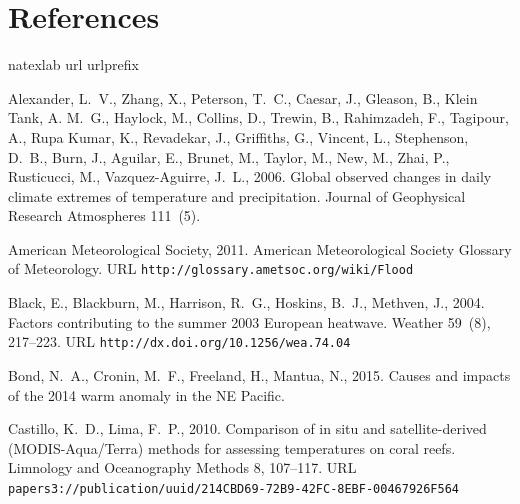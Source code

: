 \documentclass[a4paper,10pt,review]{elsarticle}
\begin{document}
%
\section*{References}

\begin{thebibliography}{50} %
\expandafter\ifx\csname natexlab\endcsname\relax\def\natexlab#1{#1}\fi
\expandafter\ifx\csname url\endcsname\relax
  \def\url#1{\texttt{#1}}\fi
\expandafter\ifx\csname urlprefix\endcsname\relax\def\urlprefix{URL }\fi

Alexander, L.~V., Zhang, X., Peterson, T.~C., Caesar, J., Gleason, B., {Klein
  Tank}, A. M.~G., Haylock, M., Collins, D., Trewin, B., Rahimzadeh, F.,
  Tagipour, A., {Rupa Kumar}, K., Revadekar, J., Griffiths, G., Vincent, L.,
  Stephenson, D.~B., Burn, J., Aguilar, E., Brunet, M., Taylor, M., New, M.,
  Zhai, P., Rusticucci, M., Vazquez-Aguirre, J.~L., 2006. {Global observed
  changes in daily climate extremes of temperature and precipitation}. Journal
  of Geophysical Research Atmospheres 111~(5).

{American Meteorological Society}, 2011. {American Meteorological Society
  Glossary of Meteorology}.
\newline\urlprefix\url{http://glossary.ametsoc.org/wiki/Flood}

Black, E., Blackburn, M., Harrison, R.~G., Hoskins, B.~J., Methven, J., 2004.
  {Factors contributing to the summer 2003 European heatwave}. Weather 59~(8),
  217--223.
\newline\urlprefix\url{http://dx.doi.org/10.1256/wea.74.04}

Bond, N.~A., Cronin, M.~F., Freeland, H., Mantua, N., 2015. {Causes and impacts
  of the 2014 warm anomaly in the NE Pacific}.

Castillo, K.~D., Lima, F.~P., 2010. {Comparison of in situ and
  satellite-derived (MODIS-Aqua/Terra) methods for assessing temperatures on
  coral reefs}. Limnology and Oceanography Methods 8, 107--117.
\newline\urlprefix\url{papers3://publication/uuid/214CBD69-72B9-42FC-8EBF-00467926F564}


\end{thebibliography}
\end{document}
